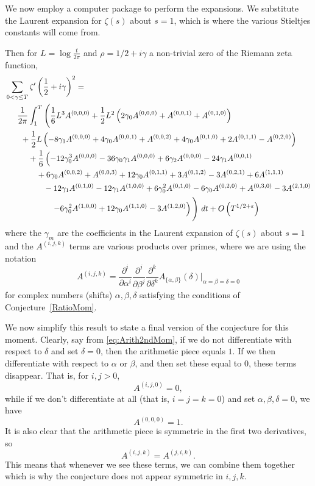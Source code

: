 \documentclass[12pt,a4paper,reqno]{amsart}
\theoremstyle{remark}
\numberwithin{equation}{section}
\begin{document}
We now employ a computer package to perform the expansions. We substitute the Laurent expansion for $\zeta (s)$ about $s=1$, which is where the various Stieltjes constants will come from. 

Then for $L = \log \frac{t}{2\pi}$ and $\rho=1/2 + i\gamma$ a non-trivial zero of the Riemann zeta function,
\begin{align}
    &\sum_{0 < \gamma \leq T} \zeta ' \left(\frac{1}{2} + i \gamma \right)^2 = \notag \\
    &\hphantom{spa}\frac{1}{2 \pi} \int_{1}^{T} \Bigg( \frac{1}{6} L^3 A^{(0,0,0)} +\frac{1}{2} L^2 \left(2 \gamma_0 A^{(0,0,0)}+ A^{(0,0,1)}+A^{(0,1,0)}\right) \notag \\
   &\hphantom{spac}+\frac{1}{2} L \left(-8 \gamma_1 A^{(0,0,0)} + 4 \gamma_0 A^{(0,0,1)}+A^{(0,0,2)}+4 \gamma_0  A^{(0,1,0)}+2A^{(0,1,1)}-A^{(0,2,0)} \right) \notag \\
   &\hphantom{spaces}+\frac{1}{6}
   \left(-12 \gamma_0^3 A^{(0,0,0)} -36 \gamma_0 \gamma_1 A^{(0,0,0)} +6 \gamma_2 A^{(0,0,0)} -24 \gamma_1 A^{(0,0,1)}   \right. \notag \\
   &\hphantom{spacespa} +6 \gamma_0  A^{(0,0,2)} +A^{(0,0,3)} +12 \gamma_0  A^{(0,1,1)} +3 A^{(0,1,2)}-3 A^{(0,2,1)}+6 A^{(1,1,1)}  \notag \\
   &\hphantom{spacespace} -12 \gamma_1 A^{(0,1,0)} -12 \gamma_1 A^{(1,0,0)} +6 \gamma_0^2 A^{(0,1,0)} -6\gamma_0  A^{(0,2,0)} +A^{(0,3,0)} -3 A^{(2,1,0)} \notag \\
   &\hphantom{spacespacesp}  \left.  -6 \gamma_0^2 A^{(1,0,0)} +12 \gamma_0 A^{(1,1,0)}-3A^{(1,2,0)}\right) \Bigg) \ dt   + O\left( T^{1/2 +\varepsilon} \right)
\end{align}
where the $\gamma_m$ are the coefficients in the Laurent expansion of $\zeta (s)$ about $s=1$ and the $A^{(i,j,k)}$ terms are various products over primes, where we are using the notation
\[
A^{(i,j,k)} = \frac{\partial^i}{\partial \alpha^i} \frac{\partial^j}{\partial \beta^j}\frac{\partial^k}{\partial \delta^k} A_{\{\alpha, \beta\}}(\delta)\Bigg|_{\alpha=\beta=\delta=0}
\]
for complex numbers (shifts) $\alpha, \beta, \delta$ satisfying the conditions of Conjecture~\ref{RatioMom}.


We now simplify this result to state a final version of the conjecture for this moment. Clearly, say from \eqref{eq:Arith2ndMom}, if we do not differentiate with respect to $\delta$ and set $\delta=0$, then the arithmetic piece equals $1$. If we then differentiate with respect to $\alpha$ or $\beta$, and then set these equal to $0$, these terms disappear. That is, for $i,j >0$,
\[
A^{(i,j,0)} = 0,
\]
while if we don't differentiate at all (that is, $i=j=k=0$) and set $\alpha,\beta,\delta=0$, we have
$$A^{(0,0,0)}=1.$$
It is also clear that the arithmetic piece is symmetric in the first two derivatives, so
\[
A^{(i,j,k)} = A^{(j,i,k)}.
\]
This means that whenever we see these terms, we can combine them together which is why the conjecture does not appear symmetric in $i,j,k$.
\end{document}
